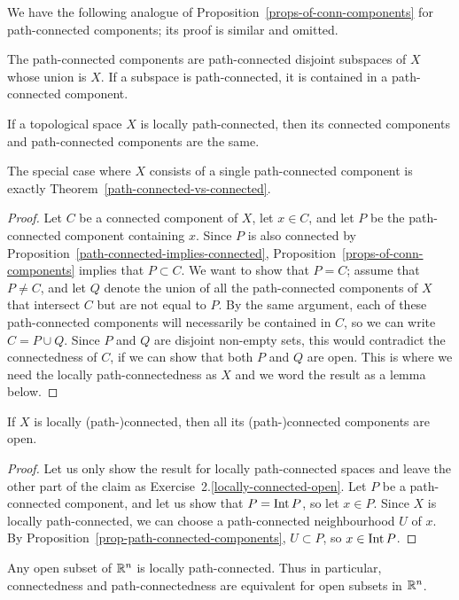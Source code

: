 We have the following analogue of Proposition~\ref{props-of-conn-components} for path-connected components; its proof is similar and omitted.
\begin{prop}
  \label{prop-path-connected-components}
  The path-connected components are path-connected disjoint subspaces of $X$ whose union is $X$. If a subspace is path-connected, it is contained in a path-connected component.
\end{prop}
\begin{thm}
  If a topological space $X$ is locally path-connected, then its connected components and path-connected components are the same.
\end{thm}
The special case where $X$ consists of a single path-connected component is exactly Theorem~\ref{path-connected-vs-connected}.
\begin{proof}
  Let $C$ be a connected component of $X$, let $x \in C$, and let $P$ be the path-connected component containing $x$. Since $P$ is also connected by Proposition~\ref{path-connected-implies-connected}, Proposition~\ref{props-of-conn-components} implies that $P \subset C$. We want to show that $P = C$; assume that $P \not= C$, and let $Q$ denote the union of all the path-connected components of $X$ that intersect $C$ but are not equal to $P$. By the same argument, each of these path-connected components will necessarily be contained in $C$, so we can write $C = P \cup Q$. Since $P$ and $Q$ are disjoint non-empty sets, this would contradict the connectedness of $C$, if we can show that both $P$ and $Q$ are open. This is where we need the locally path-connectedness as $X$ and we word the result as a lemma below.
\end{proof}
\begin{lem}
  If $X$ is locally (path-)connected, then all its (path-)connected components are open.
\end{lem}
\begin{proof}
  Let us only show the result for locally path-connected spaces and leave the other part of the claim as Exercise~2.\ref{locally-connected-open}. Let $P$ be a path-connected component, and let us show that $P = \operatorname{Int} P$, so let $x \in P$. Since $X$ is locally path-connected, we can choose a path-connected neighbourhood $U$ of $x$. By Proposition~\ref{prop-path-connected-components}, $U \subset P$, so $x \in \operatorname{Int} P$.
\end{proof}
\begin{example}
  Any open subset of $\mathbb{R}^n$ is locally path-connected. Thus in particular, connectedness and path-connectedness are equivalent for open subsets in $\mathbb{R}^n$.
\end{example}
